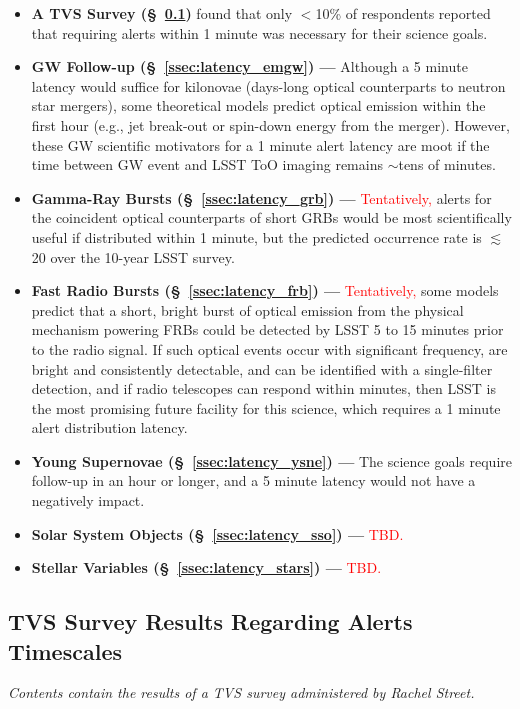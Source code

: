 \documentclass[DM,lsstdraft,authoryear,toc]{lsstdoc}
\begin{document}
\begin{itemize}
\item {\bf A TVS Survey (\S~\ref{ssec:latency_tvs})} found that only $<$10\% of respondents reported that requiring alerts within 1 minute was necessary for their science goals.
\item {\bf GW Follow-up (\S~\ref{ssec:latency_emgw}) ---} Although a 5 minute latency would suffice for kilonovae (days-long optical counterparts to neutron star mergers), some theoretical models predict optical emission within the first hour (e.g., jet break-out or spin-down energy from the merger). However, these GW scientific motivators for a 1 minute alert latency are moot if the time between GW event and LSST ToO imaging remains $\sim$tens of minutes.
\item {\bf Gamma-Ray Bursts (\S~\ref{ssec:latency_grb}) ---} \textcolor{red}{Tentatively,} alerts for the coincident optical counterparts of short GRBs would be most scientifically useful if distributed within 1 minute, but the predicted occurrence rate is $\lesssim$20 over the 10-year LSST survey.
\item {\bf Fast Radio Bursts (\S~\ref{ssec:latency_frb}) ---} \textcolor{red}{Tentatively,} some models predict that a short, bright burst of optical emission from the physical mechanism powering FRBs could be detected by LSST 5 to 15 minutes prior to the radio signal.
If such optical events occur with significant frequency, are bright and consistently detectable, and can be identified with a single-filter detection, and if radio telescopes can respond within minutes, then LSST is the most promising future facility for this science, which requires a 1 minute alert distribution latency.
\item {\bf Young Supernovae (\S~\ref{ssec:latency_ysne}) ---} The science goals require follow-up in an hour or longer, and a 5 minute latency would not have a negatively impact.
\item {\bf Solar System Objects (\S~\ref{ssec:latency_sso}) ---} \textcolor{red}{TBD.}
\item {\bf Stellar Variables (\S~\ref{ssec:latency_stars}) ---} \textcolor{red}{TBD.}
\end{itemize}


\subsection{TVS Survey Results Regarding Alerts Timescales}\label{ssec:latency_tvs}
{\it Contents contain the results of a TVS survey administered by Rachel Street.}
\end{document}
